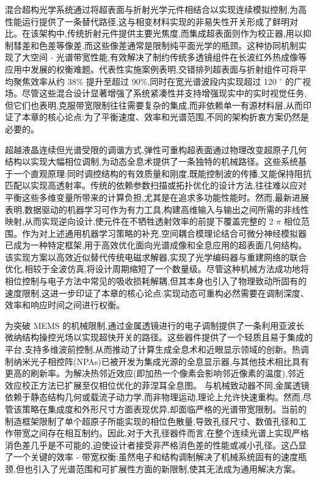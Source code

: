 混合超构光学系统通过将超表面与折射光学元件相结合以实现连续模拟控制,为高性能运行提供了一条替代路径,这与相变材料实现的非易失性开关形成了鲜明对比。在该架构中,传统折射元件提供主要光焦度,而集成超表面则作为校正器,用以抑制彗差和色差等像差,而这些像差通常是限制纯平面光学的瓶颈。这种协同机制实现了大空间 - 光谱带宽性能,有效解决了制约传统多透镜组件在长波红外热成像等应用中发展的权衡难题。代表性实施案例表明,交错排列超表面与折射组件可将平均聚焦效率从约 38\% 提升至超过 90\%,同时在宽光谱波段内实现超过 120 \(^\circ\) 的广视场。尽管这些混合设计显著增强了系统紧凑性并支持增强现实中的实时视觉任务,但它们也表明,克服带宽限制往往需要复杂的集成,而非依赖单一有源材料层,从而印证了本章的核心论点:为了平衡速度、效率和光谱范围,不同的架构折衷方案仍然是必要的。\citep{doi_10_1002_lpor_71431_d57da40c} \citep{doi_10_1364_ao_516890_6221deea}

超越液晶连续但光谱受限的调谐方式,弹性可重构超表面通过物理改变超原子几何结构以实现大幅相位调制,为动态全息术提供了一条独特的机械路径。这些系统基于一个直观原理:同时调控结构的有效质量和刚度,既能控制波的传播,又能保持阻抗匹配以实现高透射率。传统的依赖参数扫描或拓扑优化的设计方法,往往难以应对平衡这些多维变量所带来的计算负担,尤其是在追求多功能性能时。然而,最新进展表明,数据驱动的机器学习可作为有力工具,构建高维输入与输出之间所需的非线性映射,从而实现逆向设计,使元件在不牺牲透射效率的前提下覆盖完整的 2 \(\pi\) 相位范围。作为对上述通用机器学习策略的补充,空间耦合模理论结合可微分神经模拟器已成为一种特定框架,用于高效优化面向光谱成像和全息应用的超表面几何结构。该实现方案以高效近似替代传统电磁求解器,实现了光学编码器与重建网络的联合优化,相较于全波仿真,将设计周期缩短了一个数量级。尽管这种机械方法成功地将相位控制与电子方法中常见的吸收损耗解耦,但其本身也引入了物理致动所固有的速度限制,这进一步印证了本章的核心论点:实现动态可重构必然需要在调制深度、效率和响应时间之间进行权衡。\citep{doi_10_1016_j_matdes_2022_111560_e69e3350} \citep{doi_10_1021_acsphotonics_4c00171_f68cb79c} \citep{s2_76a83ea3baed75ad88b7f0782eb9a694a330c853_cee16cac}

为突破 MEMS 的机械限制,通过金属透镜进行的电子调制提供了一条利用亚波长微纳结构操控光场以实现超快开关的路径。这些器件提供了一个轻质且易于集成的平台,支持多维波前控制,从而推动了计算生成全息术和近眼显示领域的创新。热调制纳米光子相控阵(NPAs)已被开发为集成光源的全息显示器,与其他技术相比具有更高的刷新率。为解决热邻近效应(即加热一个像素会影响邻近像素的温度),邻近效应校正方法已扩展至仅相位优化的菲涅耳全息图。\citep{doi_10_1109_vr50410_2021_00058_601721f7} 与机械致动器不同,金属透镜依赖于静态结构几何或载流子动力学,而非物理运动,理论上允许快速重构。然而,尽管该策略在集成度和外形尺寸方面表现优异,却面临严格的光谱带宽限制。当前的制造框架限制了单个超原子所能实现的相位色散量,导致孔径尺寸、数值孔径和工作带宽之间存在相互制约。因此,对于大孔径器件而言,在整个连续光谱上实现严格消色差几乎是不可能的,迫使设计者接受非严格消色差的性能或减小孔径。这凸显了一个关键的效率 - 带宽权衡:虽然电子和结构调制解决了机械系统固有的速度瓶颈,但也引入了光谱范围和可扩展性方面的新限制,使其无法成为通用解决方案。\citep{doi_10_1038_s41377_026_02272_y_42e58df2}

